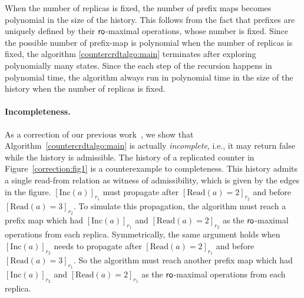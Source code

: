 When the number of replicas is fixed, the number of prefix maps becomes polynomial in the size of the history. This follows from the fact that prefixes are uniquely defined by their $\mathsf{ro}$-maximal operations, whose number is fixed. Since the possible number of prefix-map is polynomial when the number of replicas is fixed, the algorithm \ref{countercrdtalgo:main} terminates after exploring polynomially many states. Since the each step of the recursion happens in polynomial time, the algorithm always run in polynomial time in the size of the history when the number of replicas is fixed. 




\paragraph{Incompleteness.}
As a correction of our previous work~\cite{DBLP:conf/cav/BiswasEE19}, we show that Algorithm~\ref{countercrdtalgo:main} is actually \emph{incomplete}, i.e., it may return false while the history is admissible. The history of a replicated counter in Figure~\ref{correction:fig1} is a counterexample to completeness. This history admits a single read-from relation as witness of admissibility, which is given by the edges in the figure. $[\mathrm{Inc}(a)]_{r_1}$ must propagate after $[\mathrm{Read}(a) = 2]_{r_2}$ and before $[\mathrm{Read}(a) = 3]_{r_2}$. To simulate this propagation, the algorithm must reach a prefix map which had $[\mathrm{Inc}(a)]_{r_1}$ and $[\mathrm{Read}(a) = 2]_{r_2}$ as the $\mathsf{ro}$-maximal operations from each replica. Symmetrically, the same argument holds when $[\mathrm{Inc}(a)]_{r_2}$ needs to propagate after $[\mathrm{Read}(a) = 2]_{r_1}$ and before $[\mathrm{Read}(a) = 3]_{r_1}$. So the algorithm must reach another prefix map which had $[\mathrm{Inc}(a)]_{r_2}$ and $[\mathrm{Read}(a) = 2]_{r_1}$ as the $\mathsf{ro}$-maximal operations from each replica. 


